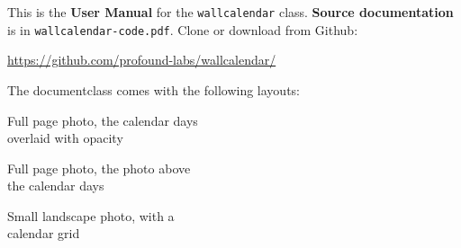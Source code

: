 \bigskip

\thispagestyle{empty}

This is the \textbf{User Manual} for the \texttt{wallcalendar} class.
\textbf{Source documentation} is in \texttt{wallcalendar-code.pdf}. Clone or
download from Github:

\href{https://github.com/profound-labs/wallcalendar/}{https://github.com/profound-labs/wallcalendar/}

The documentclass comes with the following layouts:

\bigskip

\makeatletter
\newlength\exampleWidth
\setlength{\exampleWidth}{45mm}
\makeatother

\begin{extrafullwidth}

\hfill
\begin{minipage}{0.31\linewidth}
\centering

Full page photo, the calendar days\\
overlaid with opacity

\bigskip


\end{minipage}%
\begin{minipage}{0.31\linewidth}
\centering

Full page photo, the photo above\\
the calendar days

\bigskip


\end{minipage}%
\begin{minipage}{0.31\linewidth}
\centering

Small landscape photo, with a\\
calendar grid

\bigskip


\end{minipage}
\hfill\mbox{}

\end{extrafullwidth}

\bigskip


